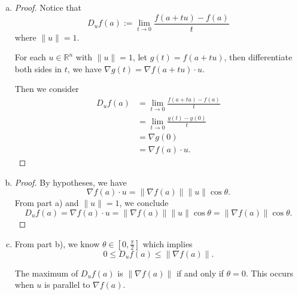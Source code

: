 \begin{Exercise}
\begin{enumerate}[a)]
\item
\begin{proof}
Notice that
$$
D_u f(a) := \lim_{t\to 0}\frac{f(a+t u)-f(a)}{t}
$$
where $\| u \| = 1$.

For each $u\in\mathbb{R}^n$ with $\| u \| = 1$, let $g(t) = f(a+t u)$, then differentiate both sides in $t$, we have $\nabla g(t) = \nabla f(a+t u)\cdot u$.

Then we consider
\begin{align*}
D_u f(a) 
&= \lim_{t\to 0}\frac{f(a+t u)-f(a)}{t} \\
&= \lim_{t\to 0}\frac{g(t)-g(0)}{t} \\
&= \nabla g(0) \\
&= \nabla f(a)\cdot u.
\end{align*}
\end{proof}

\item
\begin{proof}
By hypotheses, we have
$$
\nabla f(a) \cdot u = \| \nabla f(a) \| \| u \| \cos \theta.
$$
From part a) and $\| u \| = 1$, we conclude
$$
D_u f(a) = \nabla f(a)\cdot u = \| \nabla f(a) \| \| u \| \cos \theta =  \| \nabla f(a) \| \cos \theta.
$$
\end{proof}

\item
\begin{solution}
From part b), we know $\theta \in [0,\frac{\pi}{2}]$ which implies 
$$
0\leq D_u f(a) \leq \| \nabla f(a) \|.
$$

The maximum of $D_u f(a)$ is $\| \nabla f(a) \|$ if and only if $\theta = 0$. This occurs when $u$ is parallel to $\nabla f(a)$.
\end{solution}
\end{enumerate}
\end{Exercise}